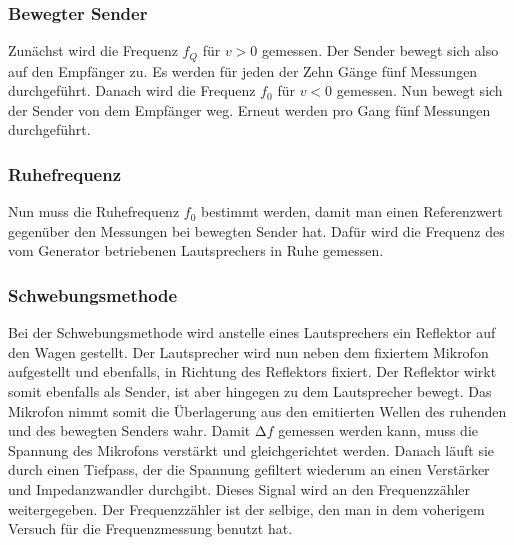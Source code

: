 \documentclass[parskip=half]{scrartcl}
\begin{document}
\subsubsection{Bewegter Sender}
Zunächst wird die Frequenz $f_Q$ für $v >0 $ gemessen. Der Sender bewegt sich also auf den Empfänger zu. Es werden für jeden der Zehn Gänge fünf Messungen durchgeführt.
Danach wird die Frequenz $f_0$ für $v < 0$ gemessen. Nun bewegt sich der Sender von dem Empfänger weg. Erneut werden pro Gang fünf Messungen durchgeführt.
\subsubsection{Ruhefrequenz}
Nun muss die Ruhefrequenz $f_0$ bestimmt werden, damit man einen Referenzwert gegenüber den Messungen bei bewegten Sender hat. Dafür wird die Frequenz des vom Generator betriebenen Lautsprechers in Ruhe gemessen.
\subsubsection{Schwebungsmethode}
Bei der Schwebungsmethode wird anstelle eines Lautsprechers ein Reflektor auf den Wagen gestellt. Der Lautsprecher wird nun neben dem fixiertem Mikrofon aufgestellt und ebenfalls, in Richtung des Reflektors fixiert. Der Reflektor wirkt somit ebenfalls als Sender, ist aber hingegen zu dem Lautsprecher bewegt. Das Mikrofon nimmt somit die Überlagerung aus den emitierten Wellen des ruhenden und des bewegten Senders wahr.
Damit $\increment f$ gemessen werden kann, muss die Spannung des Mikrofons verstärkt und gleichgerichtet werden. Danach läuft sie durch einen Tiefpass, der die Spannung gefiltert wiederum an einen Verstärker und Impedanzwandler durchgibt. Dieses Signal wird an den Frequenzzähler weitergegeben. Der Frequenzzähler ist der selbige, den man in dem voherigem Versuch für die Frequenzmessung benutzt hat.
\end{document}

